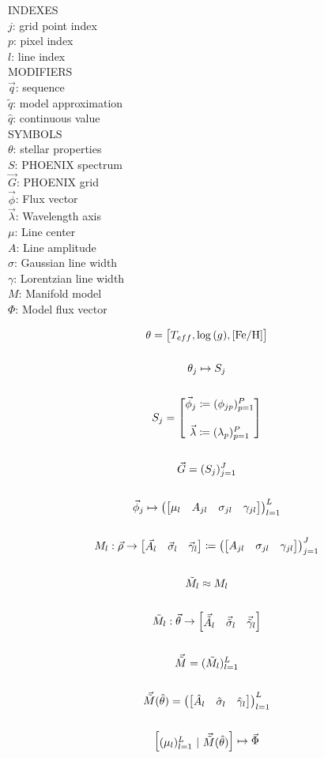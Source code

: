 \documentclass{article}
\begin{document}
\centering
INDEXES\\
$j$: grid point index\\
$p$: pixel index\\
$l$: line index\\

MODIFIERS\\
$\vec{q}$: sequence\\
$\tilde{q}$: model approximation\\
$\hat{q}$: continuous value\\

SYMBOLS\\
$\theta$: stellar properties\\
$S$: PHOENIX spectrum\\
$\vec{G}$: PHOENIX grid\\
$\vec{\phi}$: Flux vector\\
$\vec{\lambda}$: Wavelength axis\\
$\mu$: Line center\\
$A$: Line amplitude\\
$\sigma$: Gaussian line width\\
$\gamma$: Lorentzian line width\\
$M$: Manifold model\\
$\Phi$: Model flux vector

\begin{gather*}
\theta = \mqty[T_{eff}, \log{(g)}, [\text{Fe/H}]] \\\\
\theta_j \mapsto S_j \\\\
S_j = \mqty[\vec{\phi}_j \coloneqq (\phi_{jp})_{p=1}^P \\\\ \vec{\lambda} \coloneqq (\lambda_{p})_{p=1}^P] \\\\
\vec{G} = (S_j)_{j=1}^J \\\\
\vec{\phi}_j \mapsto \left(\mqty[\mu_{l} & A_{jl} & \sigma_{jl} & \gamma_{jl}]\right)_{l=1}^L \\\\
M_{l}: \vec{\rho} \to \mqty[\vec{A}_l & \vec{\sigma}_l & \vec{\gamma}_l] \coloneqq \left(\mqty[A_{jl} & \sigma_{jl} & \gamma_{jl}]\right)_{j=1}^J \\\\
\tilde{M}_l \approx M_l \\\\
\tilde{M}_l: \vec{\theta} \to \mqty[\vec{\tilde{A}}_l & \vec{\tilde{\sigma}}_l & \vec{\tilde{\gamma}}_l] \\\\
\vec{\tilde{M}} = (\tilde{M_l})_{l=1}^L \\\\
\vec{\tilde{M}}(\hat{\theta}) = \left(\mqty[\hat{A}_l & \hat{\sigma}_l & \hat{\gamma}_l]\right)_{l=1}^L \\\\
\mqty[(\mu_l)_{l=1}^L ~|~ \vec{\tilde{M}}(\hat{\theta})] \mapsto \vec{\Phi}
\end{gather*}
\end{document}
